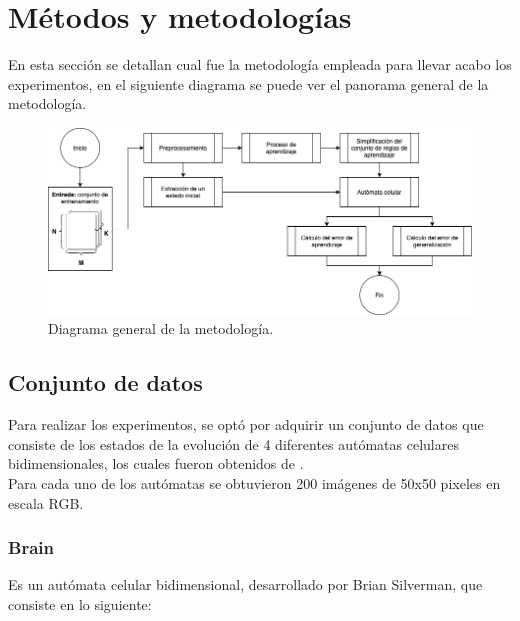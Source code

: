 \chapter{Métodos y metodologías}

En esta sección se detallan cual fue la metodología empleada para llevar acabo los experimentos, en el siguiente diagrama se puede ver el panorama general de la metodología.

\begin{figure}[H]
	\centering
	\includegraphics[width=\linewidth]{fig/metodologia}
	\caption{Diagrama general de la metodología.}
	\label{fig:metodologia}
\end{figure}

\section{Conjunto de datos}

Para realizar los experimentos, se optó por adquirir un conjunto de datos que consiste de los estados de la evolución de 4 diferentes autómatas celulares bidimensionales, los cuales fueron obtenidos de \cite{rucker_walker}.
\\
Para cada uno de los autómatas se obtuvieron 200 imágenes de 50x50 pixeles en escala RGB.

\subsection{Brain}

Es un autómata celular bidimensional, desarrollado por Brian Silverman, que consiste en lo siguiente:

